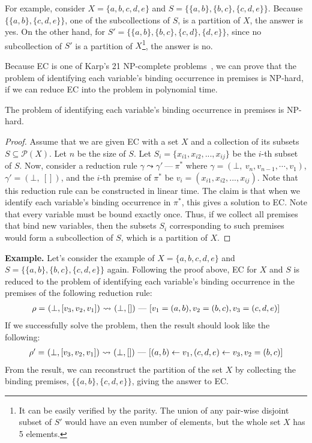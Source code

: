 \noindent
For example, consider $X = \{a, b, c, d, e\}$ and $S = \{\{a,b\}, \{b,c\}, \{c,d,e\}\}$.
Because $\{\{a,b\}, \{c,d,e\}\}$, one of the subcollections of $S$, is a partition of $X$,
the answer is yes.
On the other hand, for $S' = \{\{a,b\}, \{b,c\}, \{c,d\}, \{d,e\}\}$,
since no subcollection of $S'$ is a partition of $X$\footnote{It can be easily
verified by the parity. The union of any pair-wise disjoint subset of $S'$ would have an even number
of elements, but the whole set $X$ has 5 elements.}, the answer is no.

Because EC is one of Karp's 21 NP-complete problems~\cite{karp72},
we can prove that the problem of identifying each variable's binding occurrence in premises is NP-hard,
if we can reduce EC into the problem in polynomial time.

\begin{theorem}\label{thm:np-hard}
The problem of identifying each variable's binding occurrence in premises is NP-hard.
\end{theorem}
\begin{proof}
Assume that we are given EC with a set $X$ and
a collection of its subsets $S \subseteq \mathcal{P}(X)$. Let $n$ be the size of $S$.
Let $S_i = \{x_{i1}, x_{i2}, ..., x_{ij}\}$ be the $i$-th subset of $S$.
Now, consider a reduction rule $\gamma \leadsto \gamma'\ \mbox{---}\ \pi^*$
where $\gamma = (\bot,\ v_n, v_{n-1}, \cdots, v_1)$,
$\gamma' = (\bot,\ [])$, and
the $i$-th premise of $\pi^*$ be $v_i = (x_{i1}, x_{i2}, ..., x_{ij})$.
Note that this reduction rule can be constructed in linear time.
The claim is that when we identify each variable's binding occurrence in $\pi^*$,
this gives a solution to EC.
Note that every variable must be bound exactly once.
Thus, if we collect all premises that bind new variables,
then the subsets $S_i$ corresponding to such premises
would form a subcollection of $S$, which is a partition of $X$.
\end{proof}

\textbf{Example.}
Let's consider the example of $X = \{a, b, c, d, e\}$ and $S = \{\{a,b\}, \{b,c\}, \{c,d,e\}\}$ again.
Following the proof above, EC for $X$ and $S$ is reduced to the problem of
identifying each variable's binding occurrence in the premises of the
following reduction rule:
\[
\begin{array}{l@{~}l@{~}c@{~}l}
\rho = & (\bot, [v_3, v_2, v_1]) &\leadsto& (\bot, [])\ \mbox{---}\
[v_1 = (a,b), v_2 = (b,c), v_3 = (c, d, e)]
\end{array}
 \]
If we successfully solve the problem, then the result should look like the following:
\[
\begin{array}{l@{~}l@{~}c@{~}l}
\rho' = & (\bot, [v_3, v_2, v_1]) &\leadsto& (\bot, [])\ \mbox{---}\
[(a,b) \leftarrow v_1, (c, d, e) \leftarrow v_3, v_2 = (b,c)]
\end{array}
\]
From the result, we can reconstruct the partition of the set $X$
by collecting the binding premises, $\{\{a, b\}, \{c, d, e\}\}$, giving the answer to EC.

